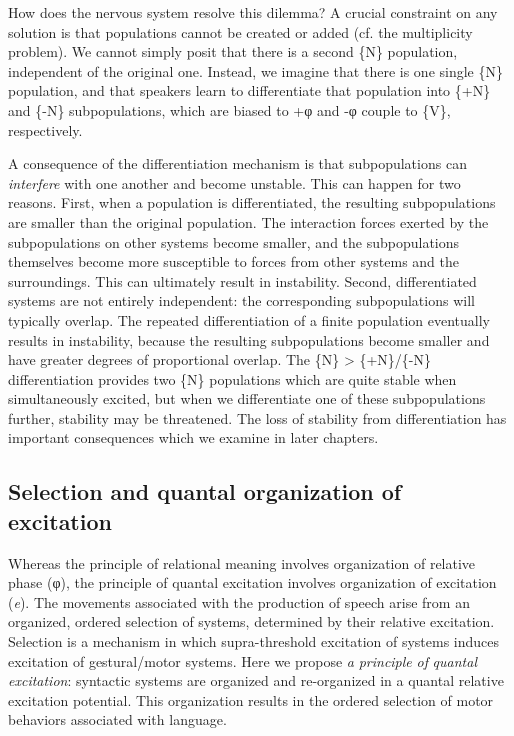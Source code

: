   How does the nervous system resolve this dilemma? A crucial constraint on any solution is that populations cannot be created or added (cf. the multiplicity problem). We cannot simply posit that there is a second \{N\} population, independent of the original one. Instead, we imagine that there is one single \{N\} population, and that speakers learn to differentiate that population into \{+N\} and \{-N\} subpopulations, which are biased to +φ and -φ couple to \{V\}, respectively.

  A consequence of the differentiation mechanism is that subpopulations can \textit{interfere} with one another and become unstable. This can happen for two reasons. First, when a population is differentiated, the resulting subpopulations are smaller than the original population. The interaction forces exerted by the subpopulations on other systems become smaller, and the subpopulations themselves become more susceptible to forces from other systems and the surroundings. This can ultimately result in instability. Second, differentiated systems are not entirely independent: the corresponding subpopulations will typically overlap. The repeated differentiation of a finite population eventually results in instability, because the resulting subpopulations become smaller and have greater degrees of proportional overlap. The \{N\} > \{+N\}/\{-N\} differentiation provides two \{N\} populations which are quite stable when simultaneously excited, but when we differentiate one of these subpopulations further, stability may be threatened. The loss of stability from differentiation has important consequences which we examine in later chapters.

\subsection{Selection and quantal organization of excitation}

Whereas the principle of relational meaning involves organization of relative phase (φ), the principle of quantal excitation involves organization of excitation (\textit{e}). The movements associated with the production of speech arise from an organized, ordered selection of systems, determined by their relative excitation. Selection is a mechanism in which supra-threshold excitation of systems induces excitation of gestural/motor systems. Here we propose \textit{a} \textit{principle} \textit{of} \textit{quantal} \textit{excitation}: syntactic systems are organized and re-organized in a quantal relative excitation potential. This organization results in the ordered selection of motor behaviors associated with language.

